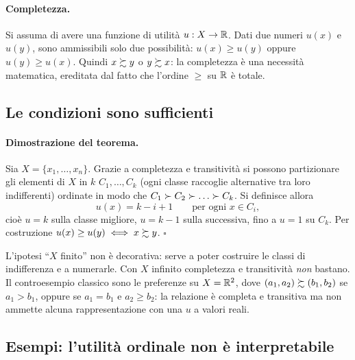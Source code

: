 \paragraph{Completezza.}
Si assuma di avere una funzione di utilità $u : X \to \mathbb{R}$. Dati due numeri $u(x)$ e $u(y)$,
sono ammissibili solo due possibilità: $u(x) \geq u(y)$ oppure $u(y) \geq u(x)$.
Quindi $x \succsim y$ o $y \succsim x$: la completezza è una necessità matematica, ereditata
dal fatto che l'ordine $\geq$ su $\mathbb{R}$ è totale.

\subsection{Le condizioni sono sufficienti}

\paragraph{Dimostrazione del teorema.}
Sia $X = \{x_1,\dots,x_n\}$. Grazie a completezza e transitività si possono partizionare
gli elementi di $X$ in $k$  $C_1, \dots, C_k$ (ogni classe
raccoglie alternative tra loro indifferenti) ordinate in modo che
$C_1 \spref C_2 \spref \dots \spref C_k$. Si definisce allora
\[
  u(x) = k - i + 1 \qquad \text{per ogni } x \in C_i,
\]
cioè $u = k$ sulla classe migliore, $u = k-1$ sulla successiva, fino a $u = 1$ su $C_k$.
Per costruzione $u(x) \ge u(y) \iff x \succsim y$. $\square$

\begin{attenzione}
L'ipotesi ``$X$ finito'' non è decorativa: serve a poter costruire le classi di
indifferenza e a numerarle. Con $X$ infinito completezza e transitività \emph{non}
bastano. Il controesempio classico sono le preferenze  su
$X = \mathbb{R}^2$, dove $(a_1,a_2) \succsim (b_1,b_2)$ se $a_1 > b_1$, oppure se $a_1 = b_1$ e
$a_2 \ge b_2$: la relazione è completa e transitiva ma non ammette alcuna
rappresentazione con una $u$ a valori reali.
\end{attenzione}

\subsection{Esempi: l'utilità ordinale non è interpretabile}

